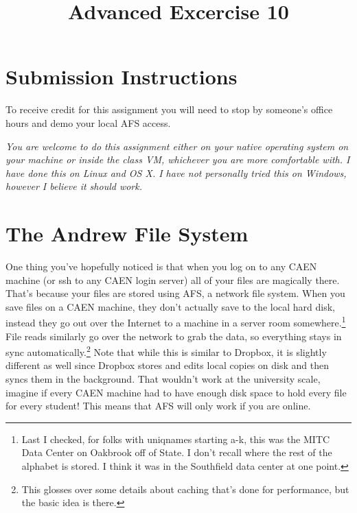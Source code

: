 \documentclass{article}
\begin{document}
\fancyfoot[C]{\color{gray} \thepage~/~\pageref*{LastPage}}
\pagestyle{fancyplain}


\title{\textbf{Advanced Excercise 10\\}}
\author{\textbf{\color{red}{Due: Saturday, December 3, 10:00PM (Hard Deadline)}}}
\date{}
\maketitle


\section*{Submission Instructions}
To receive credit for this assignment you will need to stop by someone's
office hours and demo your local AFS access.

\emph{You are welcome to do this assignment either on your native operating
  system on your machine or inside the class VM, whichever you are more
  comfortable with. I have done this on Linux and OS X. I have not personally
  tried this on Windows, however I believe it should work.}

\section*{The Andrew File System}

One thing you've hopefully noticed is that when you log on to any CAEN machine
(or ssh to any CAEN login server) all of your files are magically there.
That's because your files are stored using AFS, a network file system. When
you save files on a CAEN machine, they don't actually save to the local hard
disk, instead they go out over the Internet to a machine in a server room
somewhere.\footnote{Last I checked, for folks with uniqnames starting a-k,
this was the MITC Data Center on Oakbrook off of State. I don't recall where
the rest of the alphabet is stored. I think it was in the Southfield data
center at one point.} File reads similarly go over the network to grab the
data, so everything stays in sync automatically.\footnote{This glosses over
  some details about caching that's done for performance, but the basic idea
  is there.} Note that while this is similar to Dropbox, it is slightly
different as well since Dropbox stores and edits local copies on disk and then
syncs them in the background. That wouldn't work at the university scale,
imagine if every CAEN machine had to have enough disk space to hold every file
for every student! This means that AFS will only work if you are online.
\end{document}
